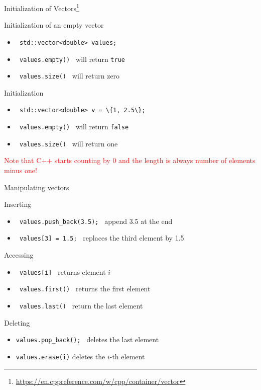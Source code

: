\documentclass[12pt]{beamer}
\begin{document}
\begin{frame}{Initialization of Vectors\footnote{\tiny{\url{https://en.cppreference.com/w/cpp/container/vector}}}}

\begin{block}{Initialization of an empty vector}
\begin{itemize}
\item \lstinline| std::vector<double> values;| 
\item \lstinline| values.empty() | will return \lstinline|true|
\item \lstinline| values.size() | will return zero
\end{itemize}
\end{block}

\begin{block}{Initialization}
\begin{itemize}
\item \lstinline| std::vector<double> v = \{1, 2.5\}; |
\item \lstinline| values.empty() | will return \lstinline|false|
\item \lstinline| values.size() | will return one
\end{itemize}
\end{block}

\textcolor{red}{Note that C++ starts counting by 0 and the length is always number of elements minus one!}

\end{frame}

\begin{frame}{Manipulating vectors}

\begin{block}{Inserting}
\begin{itemize}
\item \lstinline| values.push_back(3.5); | append 3.5 at the end
\item \lstinline| values[3] = 1.5; | replaces the third element by 1.5
\end{itemize}
\end{block}

\begin{block}{Accessing}
\begin{itemize}
\item \lstinline| values[i] | returns element $i$
\item \lstinline| values.first() | returns the first element
\item \lstinline| values.last() | return the last element
\end{itemize}
\end{block}

\begin{block}{Deleting}
\begin{itemize}
\item \lstinline|values.pop_back(); | deletes the last element
\item \lstinline|values.erase(i)| deletes the $i$-th element 
\end{itemize}
\end{block}

\end{frame}
\end{document}
